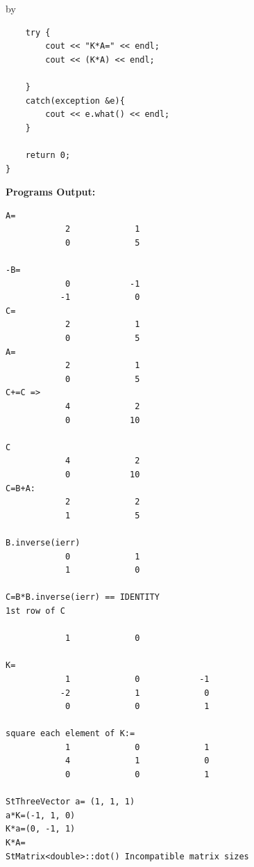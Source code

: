 \documentclass[twoside]{article}
\newcommand{\entrylabel}[1]{\mbox{\textbf{{#1}}}\hfil}%
\newenvironment{entry}
{\begin{list}{}%
    {\renewcommand{\makelabel}{\entrylabel}%
     \setlength{\labelwidth}{90pt}%
     \setlength{\leftmargin}{\labelwidth}
     \advance\leftmargin by \labelsep%
      }%
    }%
  {\end{list}}
\newcommand{\Entrylabel}[1]%
{\raisebox{0pt}[1ex][0pt]{\makebox[\labelwidth][l]%
    {\parbox[t]{\labelwidth}{\hspace{0pt}\textbf{{#1}}}}}}
\newenvironment{Entry}%
{\renewcommand{\entrylabel}{\Entrylabel}\begin{entry}}%
  {\end{entry}}
\begin{document}
\begin{Entry}
{\begin{verbatim}
    try {
        cout << "K*A=" << endl;
        cout << (K*A) << endl;
        
    }
    catch(exception &e){
        cout << e.what() << endl;
    }

    return 0;
}
\end{verbatim}
}%
{\bf Programs Output:}
{\footnotesize
\begin{verbatim}
A=
            2             1 
            0             5 

-B=
            0            -1 
           -1             0 
C=
            2             1 
            0             5 
A=
            2             1 
            0             5 
C+=C =>
            4             2 
            0            10 

C 
            4             2 
            0            10 
C=B+A:
            2             2 
            1             5 

B.inverse(ierr)
            0             1 
            1             0 

C=B*B.inverse(ierr) == IDENTITY
1st row of C

            1             0 

K=
            1             0            -1 
           -2             1             0 
            0             0             1 

square each element of K:=
            1             0             1 
            4             1             0 
            0             0             1 

StThreeVector a= (1, 1, 1)
a*K=(-1, 1, 0)
K*a=(0, -1, 1)
K*A=
StMatrix<double>::dot() Incompatible matrix sizes
\end{verbatim}
} %
\end{Entry}

\clearpage

%
%
\end{document}
